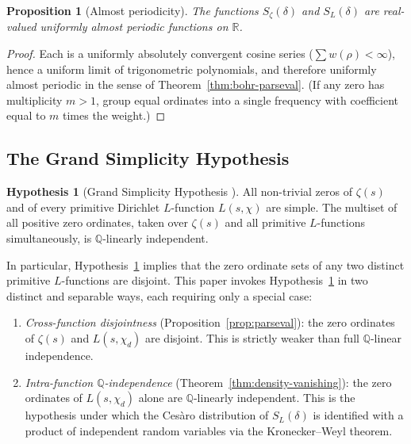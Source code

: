 \documentclass[12pt,reqno]{amsart}
\theoremstyle{plain}
\newtheorem{proposition}[theorem]{Proposition}
\theoremstyle{definition}
\newtheorem{hypothesis}[theorem]{Hypothesis}
\theoremstyle{remark}
\newcommand{\Q}{\mathbb{Q}}
\newcommand{\R}{\mathbb{R}}
\begin{document}
\begin{proposition}[Almost periodicity]\label{prop:almost-periodic}
The functions $S_\zeta(\delta)$ and $S_L(\delta)$ are real-valued uniformly almost periodic functions on $\R$.
\end{proposition}

\begin{proof}
Each is a uniformly absolutely convergent cosine series ($\sum w(\rho) < \infty$), hence a uniform limit of trigonometric polynomials, and therefore uniformly almost periodic in the sense of Theorem~\ref{thm:bohr-parseval}.  (If any zero has multiplicity $m > 1$, group equal ordinates into a single frequency with coefficient equal to $m$ times the weight.)
\end{proof}

\subsection{The Grand Simplicity Hypothesis}

\begin{hypothesis}[Grand Simplicity Hypothesis {\cite[Section~2]{RubinsteinSarnak}}]\label{hyp:GSH}
All non-trivial zeros of $\zeta(s)$ and of every primitive Dirichlet $L$-function
$L(s,\chi)$ are simple.  The multiset of all positive zero ordinates, taken over
$\zeta(s)$ and all primitive $L$-functions simultaneously, is $\Q$-linearly independent.
\end{hypothesis}

\noindent In particular, Hypothesis~\ref{hyp:GSH} implies that the zero ordinate sets of
any two distinct primitive $L$-functions are disjoint.  This paper invokes
Hypothesis~\ref{hyp:GSH} in two distinct and separable ways, each requiring only a
special case:

\begin{enumerate}[label=\textup{(\roman*)}]
\item \emph{Cross-function disjointness} (Proposition~\ref{prop:parseval}): the zero ordinates of $\zeta(s)$ and
$L(s,\chi_d)$ are disjoint.  This is strictly weaker than full $\Q$-linear independence.
\item \emph{Intra-function $\Q$-independence} (Theorem~\ref{thm:density-vanishing}): the
zero ordinates of $L(s,\chi_d)$ alone are $\Q$-linearly independent.  This is the
hypothesis under which the Ces\`aro distribution of $S_L(\delta)$ is identified with a
product of independent random variables via the Kronecker--Weyl theorem.
\end{enumerate}
\end{document}
